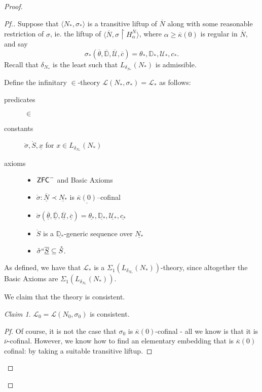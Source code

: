 \documentclass{amsart}
\theoremstyle{definition}
\theoremstyle{remark}
\newtheorem{claimno}{Claim}
\newcommand{\D}{\mathbb{D}}
\newcommand{\N}{{\overline{N}}}
\newcommand{\U}{\mathcal{U}}
\newcommand{\ZFC}{\textup{\ensuremath{\textsf{ZFC}}}}
\newcommand{\rest}{\mathbin{\upharpoonright}}
\begin{document}
\begin{proof}
\begin{proof}[Pf.]
Suppose that $\langle N_*, \sigma_* \rangle$ is a transitive liftup of $\N$ along with some reasonable restriction of $\sigma$, ie. the liftup of $\langle \N, \sigma \rest H_{\alpha}^{\N} \rangle$, where $\alpha \geq \overline \kappa(0)$ is regular in $\N$, and say $$\sigma_*(\overline \theta, \overline{\D}, \overline{\U}, \overline c) = \theta_*, \D_*, \U_*, c_*.$$ Recall that $\delta_{N_*}$ is the least such that $L_{\delta_{N_*}}(N_*)$ is admissible. 

Define the infinitary $\in$-theory $\mathcal L(N_*, \sigma_*)=\mathcal L_*$ as follows: 

\begin{description}
	\item[predicates] $\in$ 
	\item[constants] $\mathring{\sigma}, \mathring S, \underline x$ for $x \in L_{\delta_{N_*}}(N_*)$
	\item[axioms] \begin{itemize} \item $\ZFC^-$ and \textsf{Basic Axioms}
		\item $\mathring \sigma : \underline \N \prec \underline{N_*}$ is $\underline{\overline \kappa(0)}$--cofinal
		\item $\mathring{\sigma}(\overline{\underline{\theta}}, \overline{\underline{\D}}, \overline{\underline{\U}}, \overline{\underline c})=\underline{\theta_*}, \underline{\D_*}, \underline{\U_*}, \underline{c_*}$
		\item $\mathring S$ is a $\underline{\D_*}$-generic sequence over $\underline{N_*}$
		\item $\mathring \sigma ``\overline{\underline S} \subseteq \mathring S$.
	\end{itemize}
\end{description} 

As defined, we have that $\mathcal L_*$ is a $\Sigma_1(L_{\delta_{N_*}}(N_*))$-theory, since altogether the \textsf{Basic Axioms} are $\Sigma_1(L_{\delta_{N_*}}(N_*))$.

We claim that the theory is consistent.

\begin{claimno} $\mathcal L_0=\mathcal L(N_0, \sigma_0)$ is consistent. \end{claimno}
\begin{proof}[Pf] Of course, it is not the case that $\sigma_0$ is $\overline \kappa(0)$-cofinal - all we know is that it is $\overline \nu$-cofinal. However, we know how to find an elementary embedding that is $\overline \kappa(0)$ cofinal: by taking a suitable transitive liftup.


\end{proof}
\end{proof}
\end{proof}
\end{document}
